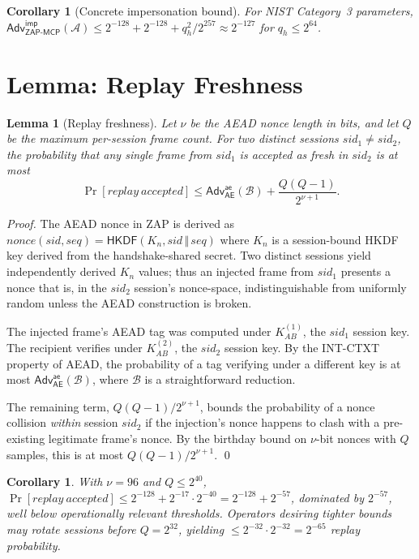 \documentclass[11pt,a4paper]{article}
\newtheorem{lemma}[theorem]{Lemma}
\newtheorem{corollary}[theorem]{Corollary}
\theoremstyle{definition}
\theoremstyle{remark}
\newcommand{\zap}{\textsf{ZAP}\xspace}
\newcommand{\zapmcp}{\textsf{ZAP-MCP}\xspace}
\newcommand{\Adv}{\mathsf{Adv}}
\newcommand{\AEAD}{\textsf{AE}}
\begin{document}
\begin{corollary}[Concrete impersonation bound]
For NIST Category~3 parameters,
$\Adv^{\mathsf{imp}}_{\zapmcp{}}(\mathcal{A}) \leq 2^{-128} + 2^{-128} +
q_h^2/2^{257} \approx 2^{-127}$ for $q_h \leq 2^{64}$.
\end{corollary}

\section{Lemma: Replay Freshness}

\begin{lemma}[Replay freshness]\label{lem:replay}
Let $\nu$ be the AEAD nonce length in bits, and let $Q$ be the maximum
per-session frame count. For two distinct sessions $\mathit{sid}_1
\neq \mathit{sid}_2$, the probability that any single frame from
$\mathit{sid}_1$ is accepted as fresh in $\mathit{sid}_2$ is at most
\[
\Pr[\mathit{replay\ accepted}] \leq
\Adv^{\mathsf{ae}}_{\AEAD}(\mathcal{B}) + \frac{Q(Q-1)}{2^{\nu+1}}.
\]
\end{lemma}

\begin{proof}
The AEAD nonce in \zap{} is derived as
$\mathit{nonce}(\mathit{sid}, \mathit{seq}) = \mathsf{HKDF}(K_n,
\mathit{sid} \,\Vert\, \mathit{seq})$ where $K_n$ is a session-bound
HKDF key derived from the handshake-shared secret. Two distinct
sessions yield independently derived $K_n$ values; thus an injected
frame from $\mathit{sid}_1$ presents a nonce that is, in the
$\mathit{sid}_2$ session's nonce-space, indistinguishable from
uniformly random unless the AEAD construction is broken.

The injected frame's AEAD tag was computed under $K_{AB}^{(1)}$, the
$\mathit{sid}_1$ session key. The recipient verifies under $K_{AB}^{(2)}$,
the $\mathit{sid}_2$ session key. By the INT-CTXT property of AEAD,
the probability of a tag verifying under a different key is at most
$\Adv^{\mathsf{ae}}_{\AEAD}(\mathcal{B})$, where $\mathcal{B}$ is a
straightforward reduction.

The remaining term, $Q(Q-1)/2^{\nu+1}$, bounds the probability of a
nonce collision \emph{within} session $\mathit{sid}_2$ if the
injection's nonce happens to clash with a pre-existing legitimate
frame's nonce. By the birthday bound on $\nu$-bit nonces with $Q$
samples, this is at most $Q(Q-1)/2^{\nu+1}$.
\qed
\end{proof}

\begin{corollary}
With $\nu = 96$ and $Q \leq 2^{40}$,
$\Pr[\mathit{replay\ accepted}] \leq 2^{-128} + 2^{-17} \cdot 2^{-40} =
2^{-128} + 2^{-57}$, dominated by $2^{-57}$, well below operationally
relevant thresholds. Operators desiring tighter bounds may rotate
sessions before $Q = 2^{32}$, yielding $\leq 2^{-32} \cdot 2^{-32} =
2^{-65}$ replay probability.
\end{corollary}
\end{document}
